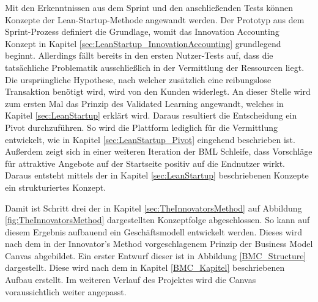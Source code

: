 Mit den Erkenntnissen aus dem Sprint und den anschließenden Tests können Konzepte der Lean-Startup-Methode angewandt werden. Der Prototyp aus dem Sprint-Prozess definiert die Grundlage, womit das Innovation Accounting Konzept in Kapitel \ref{sec:LeanStartup_InnovationAccounting} grundlegend beginnt. Allerdings fällt bereits in den ersten Nutzer-Tests auf, dass die tatsächliche Problematik ausschließlich in der Vermittlung der Ressourcen liegt. Die ursprüngliche Hypothese, nach welcher zusätzlich eine reibungslose Transaktion benötigt wird, wird von den Kunden widerlegt. An dieser Stelle wird zum ersten Mal das Prinzip des Validated Learning angewandt, welches in Kapitel \ref{sec:LeanStartup} erklärt wird. Daraus resultiert die Entscheidung ein Pivot durchzuführen. So wird die Plattform lediglich für die Vermittlung entwickelt, wie in Kapitel \ref{sec:LeanStartup_Pivot} eingehend beschrieben ist. Außerdem zeigt sich in einer weiteren Iteration der \ac{BML} Schleife, dass Vorschläge für attraktive Angebote auf der Startseite positiv auf die Endnutzer wirkt. Daraus entsteht mittels der in Kapitel \ref{sec:LeanStartup} beschriebenen Konzepte ein strukturiertes Konzept. 

Damit ist Schritt drei der in Kapitel \ref{sec:TheInnovatorsMethod} auf Abbildung \ref{fig:TheInnovatorsMethod} dargestellten Konzeptfolge abgeschlossen. So kann auf diesem Ergebnis aufbauend ein Geschäftsmodell entwickelt werden. Dieses wird nach dem in der Innovator's Method vorgeschlagenem Prinzip der Business Model Canvas abgebildet. Ein erster Entwurf dieser ist in Abbildung \ref{BMC_Structure} dargestellt. Diese wird nach dem in Kapitel \ref{BMC_Kapitel} beschriebenen Aufbau erstellt. Im weiteren Verlauf des Projektes wird die Canvas voraussichtlich weiter angepasst.

